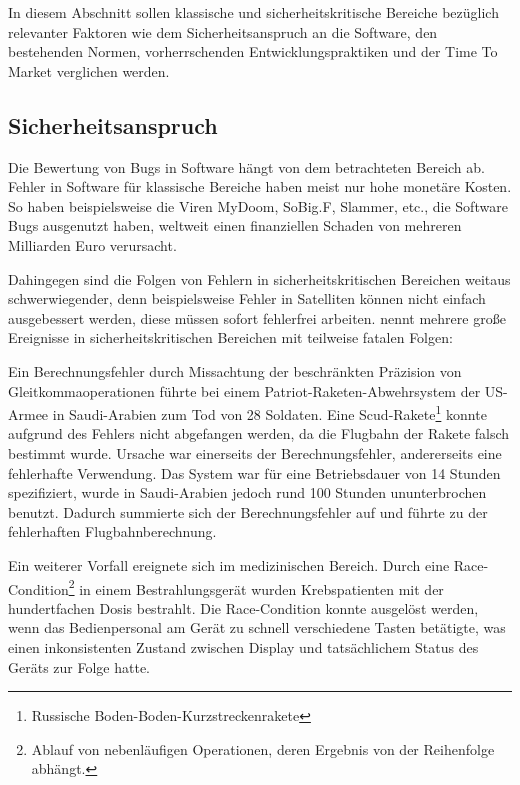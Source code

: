In diesem Abschnitt sollen klassische und sicherheitskritische Bereiche bezüglich relevanter Faktoren wie dem Sicherheitsanspruch an die Software, den bestehenden Normen, vorherrschenden Entwicklungspraktiken und der Time To Market verglichen werden.

\subsection{Sicherheitsanspruch} %

Die Bewertung von Bugs in Software hängt von dem betrachteten Bereich ab.
Fehler in Software für klassische Bereiche haben meist nur hohe monetäre Kosten.
So haben beispielsweise die Viren MyDoom, SoBig.F, Slammer, etc., die Software Bugs ausgenutzt haben, weltweit einen finanziellen Schaden von mehreren Milliarden Euro verursacht. \parencite[Vgl.][]{ComputerEconomics2004aa}

Dahingegen sind die Folgen von Fehlern in sicherheitskritischen Bereichen weitaus schwerwiegender, denn beispielsweise Fehler in Satelliten können nicht einfach ausgebessert werden, diese müssen sofort fehlerfrei arbeiten.
\parencite[][S. 87 - 89]{Zhivich:2009aa} nennt mehrere große Ereignisse in sicherheitskritischen Bereichen mit teilweise fatalen Folgen:

Ein Berechnungsfehler durch Missachtung der beschränkten Präzision von Gleitkommaoperationen führte bei einem Patriot-Raketen-Abwehrsystem der US-Armee in Saudi-Arabien zum Tod von 28 Soldaten.
Eine Scud-Rakete\footnote{Russische Boden-Boden-Kurzstreckenrakete} konnte aufgrund des Fehlers nicht abgefangen werden, da die Flugbahn der Rakete falsch bestimmt wurde.
Ursache war einerseits der Berechnungsfehler, andererseits eine fehlerhafte Verwendung.
Das System war für eine Betriebsdauer von 14 Stunden spezifiziert, wurde in Saudi-Arabien jedoch rund 100 Stunden ununterbrochen benutzt.
Dadurch summierte sich der Berechnungsfehler auf und führte zu der fehlerhaften Flugbahnberechnung.

Ein weiterer Vorfall ereignete sich im medizinischen Bereich.
Durch eine Race-Condition\footnote{Ablauf von nebenläufigen Operationen, deren Ergebnis von der Reihenfolge abhängt.} in einem Bestrahlungsgerät wurden Krebspatienten mit der hundertfachen Dosis bestrahlt.
Die Race-Condition konnte ausgelöst werden, wenn das Bedienpersonal am Gerät zu schnell verschiedene Tasten betätigte, was einen inkonsistenten Zustand zwischen Display und tatsächlichem Status des Geräts zur Folge hatte.

